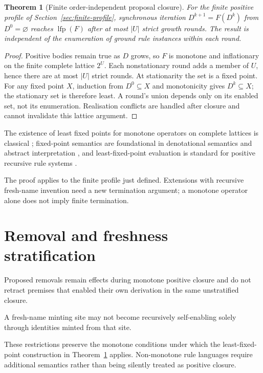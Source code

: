 \documentclass[11pt,a4paper]{article}
\newtheorem{theorem}{Theorem}[section]
\theoremstyle{remark}
\begin{document}
\begin{theorem}[Finite order-independent proposal closure]\label{thm:lfp}
For the finite positive profile of Section~\ref{sec:finite-profile}, synchronous
iteration $D^{k+1}=F(D^k)$ from $D^0=\varnothing$ reaches $\operatorname{lfp}(F)$
after at most $|U|$ strict growth rounds. The result is independent of the
enumeration of ground rule instances within each round.
\end{theorem}
\begin{proof}
Positive bodies remain true as $D$ grows, so $F$ is monotone and inflationary
on the finite complete lattice $2^U$. Each nonstationary round adds a member
of $U$, hence there are at most $|U|$ strict rounds. At stationarity the
set is a fixed point. For any fixed point $X$, induction from
$D^0\subseteq X$ and monotonicity gives $D^k\subseteq X$; the stationary
set is therefore least. A round's union depends only on its enabled set,
not its enumeration. Realisation conflicts are handled after closure and
cannot invalidate this lattice argument.
\end{proof}


The existence of least fixed points for monotone operators on complete lattices is classical \citep{tarski1955}; fixed-point semantics are foundational in denotational semantics and abstract interpretation \citep{cousot1977}, and least-fixed-point evaluation is standard for positive recursive rule systems \citep{ceri1989}.

The proof applies to the finite profile just defined. Extensions with recursive fresh-name invention need a new termination argument; a monotone operator alone does not imply finite termination.

\section{Removal and freshness stratification}\label{sec:stratification}

Proposed removals remain effects during monotone positive closure and do not retract premises that enabled their own derivation in the same unstratified closure.

A fresh-name minting site may not become recursively self-enabling solely through identities minted from that site.

These restrictions preserve the monotone conditions under which the least-fixed-point construction in Theorem~\ref{thm:lfp} applies. Non-monotone rule languages require additional semantics rather than being silently treated as positive closure.
\end{document}
